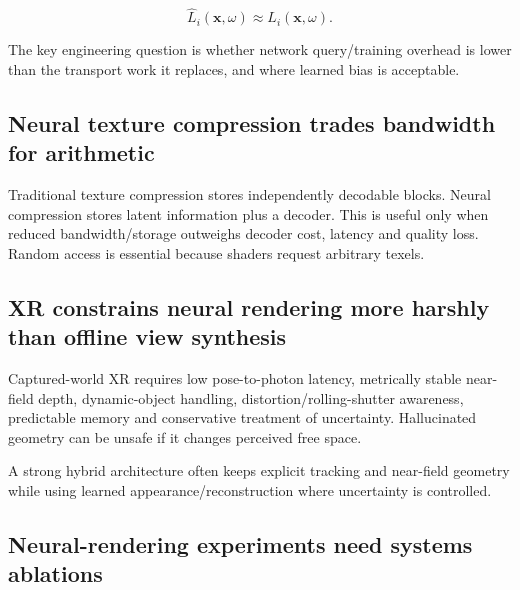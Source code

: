 \[
\hat L_i(\mathbf x,\omega)\approx L_i(\mathbf x,\omega).
\]

The key engineering question is whether network query/training overhead is lower than the transport work it replaces, and where learned bias is acceptable.

\subsection{Neural texture compression trades bandwidth for arithmetic}\label{04-visual-computing-ii-ch035-neural-texture-compression-trades-bandwidth-for-arithmetic}

\hypertarget{04-visual-computing-ii-ch035-neural-texture-compression-trades-bandwidth-for-arithmetic}{}

Traditional texture compression stores independently decodable blocks. Neural compression stores latent information plus a decoder. This is useful only when reduced bandwidth/storage outweighs decoder cost, latency and quality loss. Random access is essential because shaders request arbitrary texels.

\subsection{XR constrains neural rendering more harshly than offline view synthesis}\label{04-visual-computing-ii-ch035-xr-constrains-neural-rendering-more-harshly-than-offline-view-synthesis}

\hypertarget{04-visual-computing-ii-ch035-xr-constrains-neural-rendering-more-harshly-than-offline-view-synthesis}{}

Captured-world XR requires low pose-to-photon latency, metrically stable near-field depth, dynamic-object handling, distortion/rolling-shutter awareness, predictable memory and conservative treatment of uncertainty. Hallucinated geometry can be unsafe if it changes perceived free space.

A strong hybrid architecture often keeps explicit tracking and near-field geometry while using learned appearance/reconstruction where uncertainty is controlled.

\subsection{Neural-rendering experiments need systems ablations}\label{04-visual-computing-ii-ch035-neural-rendering-experiments-need-systems-ablations}

\hypertarget{04-visual-computing-ii-ch035-neural-rendering-experiments-need-systems-ablations}{}

